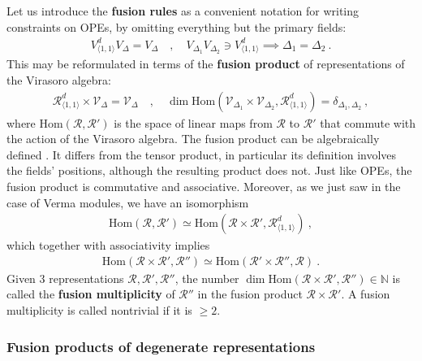 \documentclass[12pt, a4paper]{article}
\newcommand{\myindex}[1]{\textbf{\boldmath #1}}
\begin{document}
Let us introduce the \myindex{fusion rules} as a convenient notation for writing constraints on OPEs, by omitting everything but the primary fields:
\begin{align}
 V^d_{\langle 1,1\rangle} V_{\Delta} = V_\Delta \quad , \quad V_{\Delta_1} V_{\Delta_2} \ni V^d_{\langle 1,1\rangle} \implies \Delta_1=\Delta_2\ . 
\end{align}
This may be reformulated in terms of 
the \myindex{fusion product} of representations of the Virasoro algebra:
\begin{align}
 \mathcal{R}^d_{\langle 1,1\rangle} \times \mathcal{V}_\Delta = \mathcal{V}_\Delta \quad , \quad \dim\text{Hom}\left(\mathcal{V}_{\Delta_1}\times \mathcal{V}_{\Delta_2}, \mathcal{R}^d_{\langle 1,1\rangle}\right) = \delta_{\Delta_1,\Delta_2}\ ,
 \label{rtv}
\end{align}
where $\text{Hom}(\mathcal{R},\mathcal{R}')$ is the space of linear maps from $\mathcal{R}$ to $\mathcal{R}'$ that commute with the action of the Virasoro algebra. 
The fusion product can be algebraically defined \cite{gab99}. It differs from the tensor product, in particular its definition involves the fields' positions, although the resulting product does not. Just like OPEs, the fusion product is commutative and associative. Moreover, as we just saw in the case of Verma modules, we have an isomorphism
\begin{align}
 \text{Hom}\left(\mathcal{R},\mathcal{R}'\right) \simeq \text{Hom}\left(\mathcal{R}\times\mathcal{R}',\mathcal{R}^d_{\langle 1,1\rangle}\right)\ ,
\end{align}
which together with associativity implies 
\begin{align}
 \text{Hom}\left(\mathcal{R}\times\mathcal{R}',\mathcal{R}''\right) \simeq \text{Hom}\left(\mathcal{R}'\times\mathcal{R}'',\mathcal{R}\right)\ .
 \label{hrr}
\end{align}
Given 3 representations $\mathcal{R},\mathcal{R}',\mathcal{R}''$, the number $\dim \text{Hom}\left(\mathcal{R}\times\mathcal{R}',\mathcal{R}''\right) \in \mathbb{N}$ is called the \myindex{fusion multiplicity} of $\mathcal{R}''$ in the fusion product $\mathcal{R}\times\mathcal{R}'$. A fusion multiplicity is called nontrivial if it is $\geq 2$. 

\subsubsection{Fusion products of degenerate representations}
\end{document}
